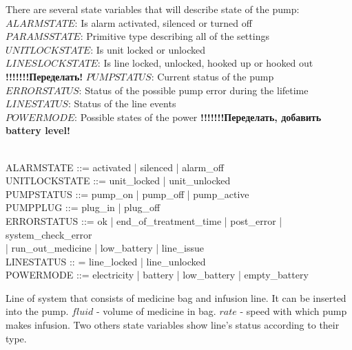 \documentclass{article}
\begin{document}
	
	There are several state variables that will describe state of the pump:\\
	
	
	$ALARMSTATE$: Is alarm activated, silenced or turned off\\
	$PARAMSSTATE$: Primitive type describing all of the settings\\
	$UNITLOCKSTATE$: Is unit locked or unlocked \\
	$LINESLOCKSTATE$: Is line locked, unlocked, hooked up or hooked out\\ \textbf{!!!!!!!Переделать!}
	$PUMPSTATUS$: Current status of the pump\\
	$ERRORSTATUS$: Status of the possible pump error during the lifetime\\
	$LINESTATUS$: Status of the line events\\
	$POWERMODE$: Possible states of the power \textbf{!!!!!!!Переделать, добавить battery level!}
	
	\begin{zed}	
		[PARAMSSTATE] \\ %
		
		ALARMSTATE ::= activated | silenced | alarm\_off \\
		
	
		UNITLOCKSTATE ::= unit\_locked | unit\_unlocked \\
	
		PUMPSTATUS ::= pump\_on | pump\_off | pump\_active \\
		
		PUMPPLUG ::=  plug\_in | plug\_off\\
		
		ERRORSTATUS ::= ok | end\_of\_treatment\_time | post\_error | system\_check\_error \\ | run\_out\_medicine | low\_battery | line\_issue \\
		
		LINESTATUS :: = line\_locked | line\_unlocked \\
		
		POWERMODE ::= electricity | battery | low\_battery | empty\_battery \\
	\end{zed}
	
	
	Line of system that consists of medicine bag and infusion line. It can be inserted into the pump. $fluid$ - volume of medicine in bag. $rate$ - speed with which pump makes infusion. Two others state variables show line's status according to their type.
	
\end{document}
